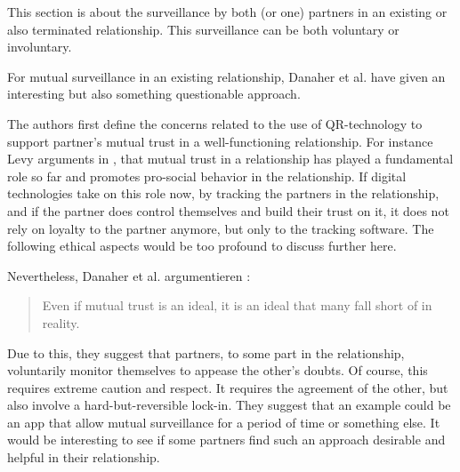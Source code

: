 This section is about the surveillance by both (or one) partners in an existing or also terminated relationship. This surveillance can be both voluntary or involuntary.

For mutual surveillance in an existing relationship, Danaher et al. \cite{doi:10.1080/15265161.2017.1409823} have given an interesting but also something questionable approach.

The authors first define the concerns related to the use of \acs{QR}-technology to support partner's mutual trust in a well-functioning relationship. For instance Levy arguments in \cite{levy2014intimate}, that mutual trust in a relationship has played a fundamental role so far and promotes pro-social behavior in the relationship. If digital technologies take on this role now, by tracking the partners in the relationship, and if the partner does control themselves and build their trust on it, it does not rely on loyalty to the partner anymore, but only to the tracking software. The following ethical aspects would be too profound to discuss further here.

Nevertheless, Danaher et al. argumentieren \cite{doi:10.1080/15265161.2017.1409823}:
\begin{quote}
	Even if mutual trust is an ideal, it is an ideal that many fall short of in reality.
\end{quote}
Due to this, they suggest that partners, to some part in the relationship, voluntarily monitor themselves to appease the other's doubts. Of course, this requires extreme caution and respect. It requires the agreement of the other, but also involve a hard-but-reversible lock-in.
They suggest that an example could be an app that allow mutual surveillance for a period of time or something else. It would be interesting to see if some partners find such an approach desirable and helpful in their relationship.

\label{subsec:D}
